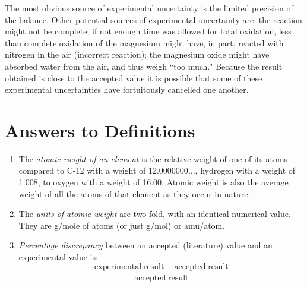 \documentclass[https://www.overleaf.com/project/63761df255a8a9f4a15c3579
	letterpaper, %
	10pt, %
]{CSUniSchoolLabReport}
\begin{document}
The most obvious source of experimental uncertainty is the limited precision of the balance. Other potential sources of experimental uncertainty are: the reaction might not be complete; if not enough time was allowed for total oxidation, less than complete oxidation of the magnesium might have, in part, reacted with nitrogen in the air (incorrect reaction); the magnesium oxide might have absorbed water from the air, and thus weigh ``too much." Because the result obtained is close to the accepted value it is possible that some of these experimental uncertainties have fortuitously cancelled one another.


\section{Answers to Definitions}

\begin{enumerate}
	\item The \textit{atomic weight of an element} is the relative weight of one of its atoms compared to C-12 with a weight of 12.0000000$\ldots$, hydrogen with a weight of 1.008, to oxygen with a weight of 16.00. Atomic weight is also the average weight of all the atoms of that element as they occur in nature.
	\item The \textit{units of atomic weight} are two-fold, with an identical numerical value. They are g/mole of atoms (or just g/mol) or amu/atom.
	\item \textit{Percentage discrepancy} between an accepted (literature) value and an experimental value is:
		\begin{equation*}
			\frac{\mathrm{experimental\;result} - \mathrm{accepted\;result}}{\mathrm{accepted\;result}}
		\end{equation*}
\end{enumerate}


\printbibliography %

\end{document}
